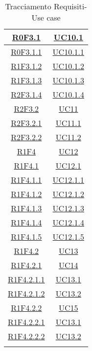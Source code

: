 \begin{longtable}{|c|c|}
\hline
\hyperlink{R0F3.1}{R0F3.1} & \hyperlink{UC10.1}{UC10.1}\\
\hline
\hyperlink{R0F3.1.1}{R0F3.1.1} & \hyperlink{UC10.1.1}{UC10.1.1}\\
\hline
\hyperlink{R1F3.1.2}{R1F3.1.2} & \hyperlink{UC10.1.2}{UC10.1.2}\\
\hline
\hyperlink{R1F3.1.3}{R1F3.1.3} & \hyperlink{UC10.1.3}{UC10.1.3}\\
\hline
\hyperlink{R2F3.1.4}{R2F3.1.4} & \hyperlink{UC10.1.4}{UC10.1.4}\\
\hline
\hyperlink{R2F3.2}{R2F3.2} & \hyperlink{UC11}{UC11}\\
\hline
\hyperlink{R2F3.2.1}{R2F3.2.1} & \hyperlink{UC11.1}{UC11.1}\\
\hline
\hyperlink{R2F3.2.2}{R2F3.2.2} & \hyperlink{UC11.2}{UC11.2}\\
\hline
\hyperlink{R1F4}{R1F4} & \hyperlink{UC12}{UC12}\\
\hline
\hyperlink{R1F4.1}{R1F4.1} & \hyperlink{UC12.1}{UC12.1}\\
\hline
\hyperlink{R1F4.1.1}{R1F4.1.1} & \hyperlink{UC12.1.1}{UC12.1.1}\\
\hline
\hyperlink{R1F4.1.2}{R1F4.1.2} & \hyperlink{UC12.1.2}{UC12.1.2}\\
\hline
\hyperlink{R1F4.1.3}{R1F4.1.3} & \hyperlink{UC12.1.3}{UC12.1.3}\\
\hline
\hyperlink{R1F4.1.4}{R1F4.1.4} & \hyperlink{UC12.1.4}{UC12.1.4}\\
\hline
\hyperlink{R1F4.1.5}{R1F4.1.5} & \hyperlink{UC12.1.5}{UC12.1.5}\\
\hline
\hyperlink{R1F4.2}{R1F4.2} & \hyperlink{UC13}{UC13}\\
\hline
\hyperlink{R1F4.2.1}{R1F4.2.1} & \hyperlink{UC14}{UC14}\\
\hline
\hyperlink{R1F4.2.1.1}{R1F4.2.1.1} & \hyperlink{UC13.1}{UC13.1}\\
\hline
\hyperlink{R1F4.2.1.2}{R1F4.2.1.2} & \hyperlink{UC13.2}{UC13.2}\\
\hline
\hyperlink{R1F4.2.2}{R1F4.2.2} & \hyperlink{UC15}{UC15}\\
\hline
\hyperlink{R1F4.2.2.1}{R1F4.2.2.1} & \hyperlink{UC13.1}{UC13.1}\\
\hline
\hyperlink{R1F4.2.2.2}{R1F4.2.2.2} & \hyperlink{UC13.2}{UC13.2}\\
\hline
\caption[Tracciamento Requisiti-Use case]{Tracciamento Requisiti-Use case}
\label{tabella:requi-usecase}
\end{longtable}
\clearpage
\normalsize
